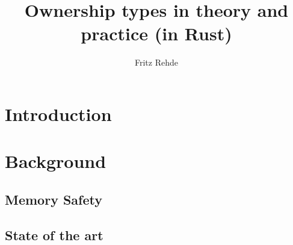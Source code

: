 \documentclass[sigplan,11pt,nonacm]{acmart}
\begin{document}
\title{Ownership types in theory and practice (in Rust)}
\author{Fritz Rehde}

\begin{abstract}


\end{abstract}


\maketitle

\section{Introduction}
\label{sec:introduction}


\section{Background}
\label{sec:background}

\subsection{Memory Safety}



\subsection{State of the art}



\end{document}
